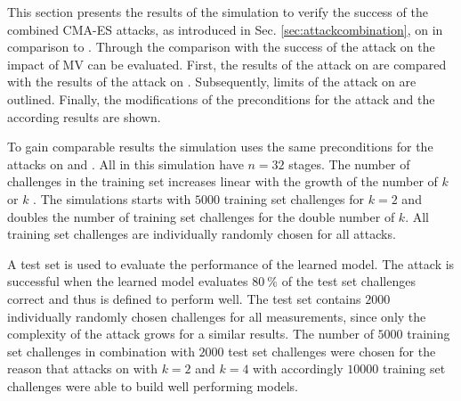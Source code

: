 This section presents the results of the simulation to verify the success of the combined \ac{CMA-ES} attacks, as introduced in Sec. \ref{sec:attackcombination}, on \mxpufs in comparison to \xpufs.
Through the comparison with the success of the attack on \xpuf the impact of \ac{MV} can be evaluated.
First, the results of the attack on \xpufs are compared with the results of the attack on \mxpufs.
Subsequently, limits of the attack on \mxpufs are outlined.
Finally, the modifications of the preconditions for the attack and the according results are shown.

To gain comparable results the simulation uses the same preconditions for the attacks on \xpufs and \mxpufs.
All \pufs in this simulation have $n = 32$ stages.
The number of challenges in the training set increases linear with the growth of the number of $k$ \apufs or $k$ \mpufs.
The simulations starts with $5000$ training set challenges for $k = 2$ and doubles the number of training set challenges for the double number of $k$.
All training set challenges are individually randomly chosen for all attacks.

A test set is used to evaluate the performance of the learned model.
The attack is successful when the learned model evaluates $80\ \%$ of the test set challenges correct and thus is defined to perform well.
The test set contains $2000$ individually randomly chosen challenges for all measurements, since only the complexity of the attack grows for a similar results.
The number of $5000$ training set challenges in combination with $2000$ test set challenges were chosen for the reason that attacks on \xpufs with $k = 2$ and $k = 4$ with accordingly $10000$ training set challenges were able to build well performing models.

